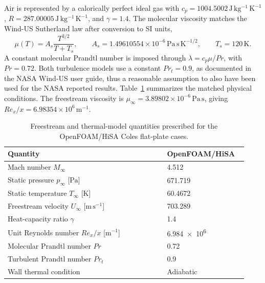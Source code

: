 Air is represented by a calorically perfect ideal gas with
\(c_p=1004.5002\,\mathrm{J\,kg^{-1}\,K^{-1}}\),
\(R=287.00005\,\mathrm{J\,kg^{-1}\,K^{-1}}\), and \(\gamma=1.4\).
The molecular viscosity matches the Wind-US Sutherland law after conversion
to SI units,
\begin{equation}
    \mu(T)=A_s\frac{T^{3/2}}{T+T_s},
    \qquad A_s=1.49610554\times10^{-6}\,\mathrm{Pa\,s\,K^{-1/2}},
    \qquad T_s=120\,\mathrm{K}.
    \label{eq:coles-sutherland-law}
\end{equation}
A constant molecular Prandtl number is imposed through
\(\lambda=c_p\mu/Pr\), with \(Pr=0.72\). Both turbulence models use a constant \(Pr_t=0.9\), as documented in the NASA Wind-US user guide, thus a reasonable assumption to also have been used for the NASA reported results. Table~\ref{tab:coles-flow-conditions} summarizes the matched physical
conditions. The freestream viscosity is \(\mu_\infty=3.89802\times10^{-6}\,\mathrm{Pa\,s}\), giving
\(Re_x/x=6.98354\times10^6\,\mathrm{m^{-1}}\).


\begin{table}[H]
    \centering
    \caption{Freestream and thermal-model quantities prescribed for the
        OpenFOAM/HiSA Coles flat-plate cases.}
    \label{tab:coles-flow-conditions}
    \small
    \setlength{\tabcolsep}{4pt}
    \renewcommand{\arraystretch}{1.12}
    \begin{tabular}{@{}p{0.62\linewidth}>{\centering\arraybackslash}p{0.31\linewidth}@{}}
        \toprule
        Quantity & {OpenFOAM/HiSA} \\
        \midrule
        Mach number \(M_\infty\) & \num{4.512} \\
        Static pressure \(p_\infty\) [\(\mathrm{Pa}\)]
            & \num{671.719} \\
        Static temperature \(T_\infty\) [\(\mathrm{K}\)]
            & \num{60.4672} \\
        Freestream velocity \(U_\infty\) [\(\mathrm{m\,s^{-1}}\)]
            & \num{703.289} \\
        Heat-capacity ratio \(\gamma\) & \num{1.4} \\
        \raggedright Unit Reynolds number \(Re_x/x\) [\(\mathrm{m^{-1}}\)]
            & \num{6.984e6} \\
        Molecular Prandtl number \(Pr\)
            & \num{0.72} \\
        Turbulent Prandtl number \(Pr_t\) & \num{0.9} \\
        Wall thermal condition & {Adiabatic} \\
        \bottomrule
    \end{tabular}
\end{table}

